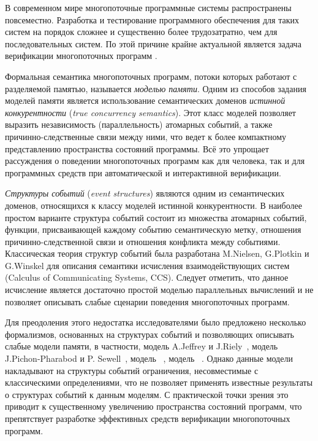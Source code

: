 
{\actuality} 
В современном мире многопоточные программные системы распространены повсеместно. 
Разработка и тестирование программного обеспечения для таких систем на порядок 
сложнее и существенно более трудозатратно, чем для последовательных систем. 
По этой причине крайне актуальной является задача 
верификации многопоточных программ . 

Формальная семантика многопоточных программ, потоки которых работают 
с разделяемой памятью, называется \emph{моделью памяти}. 
Одним из способов задания моделей памяти
является использование семантических доменов
\emph{истинной конкурентности} (\emph{true concurrency semantics}).
Этот класс моделей позволяет выразить независимость (параллельность) атомарных событий, а также 
причинно-следственные связи между ними,
что ведет к более компактному представлению пространства состояний программы.
Всё это упрощает рассуждения 
о поведении многопоточных программ как для человека, 
так и для программных средств при автоматической и интерактивной верификации. 

\emph{Структуры событий} (\emph{event structures}) являются одним из семантических доменов, 
относящихся к классу моделей истинной конкурентности.
В наиболее простом варианте структура событий состоит из множества атомарных событий,
функции, присваивающей каждому событию семантическую метку,
отношения причинно-следственной связи и отношения конфликта между событиями.
Классическая теория структур событий была разработана M.Nielsen, G.Plotkin и G.Winskel
для описания семантики исчисления взаимодействующих систем (Calculus of Communicating Systems, CCS).
Следует отметить, что данное исчисление является достаточно простой моделью параллельных вычислений и не позволяет описывать 
слабые сценарии поведения многопоточных программ.

Для преодоления этого недостатка исследователями было
предложено несколько формализмов, основанных на структурах событий
и позволяющих описывать слабые модели памяти,
в частности, модель A.Jeffrey и J.Riely~\autocite{Jeffrey-Riely:LICS16},
модель J.Pichon-Pharabod и P. Sewell~\autocite{PichonPharabod-Sewell:POPL16},
модель \Wkm~\autocite{Chakraborty-Vafeiadis:POPL19},
модель \MRD~\autocite{Paviotti-al:ESOP20}. 
Однако данные модели накладывают на структуры событий
ограничения, несовместимые с классическими определениями, что  не позволяет 
применять известные результаты о структурах событий к данным моделям. 
С практической точки зрения это приводит к существенному увеличению 
пространства состояний программ, что препятствует разработке эффективных 
средств верификации многопоточных программ.

